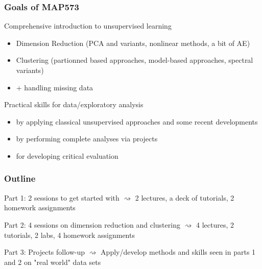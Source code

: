 \documentclass{beamer}\usepackage[]{graphicx}\usepackage[]{color}
\begin{document}
\begin{frame}
  \frametitle{Goals of MAP573}

  \begin{block}{Comprehensive introduction to unsupervised learning}  
    \begin{itemize}  
      \item Dimension Reduction {\tiny (PCA and variants, nonlinear methods,  a bit of AE)}
      \item Clustering {\tiny(partionned based approaches, model-based approaches, spectral variants)}
      \item + handling missing data
    \end{itemize}
  \end{block}

  \vfill
  
  \begin{block}{Practical skills for data/exploratory analysis}
      \begin{itemize}  
        \item by applying classical unsupervised approaches and some recent developments
        \item by performing complete analyses via projects
        \item for developing critical evaluation
      \end{itemize}
  \end{block}

\end{frame}

\begin{frame}
  \frametitle{Outline}
  
  \begin{block}{Part 1: 2 sessions to get started with }
    $\rightsquigarrow$ 2 lectures, a deck of tutorials, 2 homework assignments
  \end{block}

  \vfill

  \begin{block}{Part 2: 4 sessions on dimension reduction and clustering}
    $\rightsquigarrow$ 4 lectures, 2 tutorials, 2 labs, 4 homework assignments
  \end{block}

  \vfill

  \begin{block}{Part 3: Projects follow-up}
    $\rightsquigarrow$ Apply/develop methods and skills seen in parts 1 and 2 on "real world" data sets
  \end{block}


\end{frame}
\end{document}
